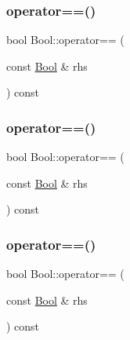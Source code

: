 \mbox{\label{struct_bool_afe799a4977c5ebe4c215d5d4ebd77adb}} 
\subsubsection{\texorpdfstring{operator==()}{operator==()}\hspace{0.1cm}{\footnotesize\ttfamily [1/3]}}
{\footnotesize\ttfamily bool Bool\+::operator== (\begin{DoxyParamCaption}\item[{const \mbox{\hyperlink{struct_bool}{Bool}} \&}]{rhs }\end{DoxyParamCaption}) const\hspace{0.3cm}{\ttfamily [inline]}}

\mbox{\label{struct_bool_afe799a4977c5ebe4c215d5d4ebd77adb}} 
\subsubsection{\texorpdfstring{operator==()}{operator==()}\hspace{0.1cm}{\footnotesize\ttfamily [2/3]}}
{\footnotesize\ttfamily bool Bool\+::operator== (\begin{DoxyParamCaption}\item[{const \mbox{\hyperlink{struct_bool}{Bool}} \&}]{rhs }\end{DoxyParamCaption}) const\hspace{0.3cm}{\ttfamily [inline]}}

\mbox{\label{struct_bool_afe799a4977c5ebe4c215d5d4ebd77adb}} 
\subsubsection{\texorpdfstring{operator==()}{operator==()}\hspace{0.1cm}{\footnotesize\ttfamily [3/3]}}
{\footnotesize\ttfamily bool Bool\+::operator== (\begin{DoxyParamCaption}\item[{const \mbox{\hyperlink{struct_bool}{Bool}} \&}]{rhs }\end{DoxyParamCaption}) const\hspace{0.3cm}{\ttfamily [inline]}}

